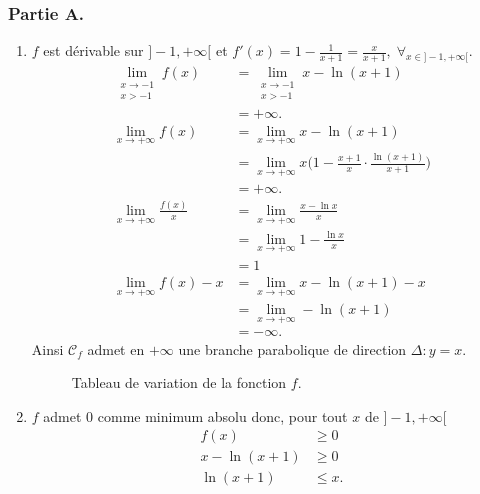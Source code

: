 \documentclass{article}
\begin{document}
\subsubsection*{Partie A.}
\begin{enumerate}
	\item $f$ est dérivable sur $]-1,+\infty[$ et $f'(x)=1-\frac{1}{x+1}=\frac{x}{x+1}, \;\forall_{x\in]-1,+\infty[}$.
	\begin{align*}
		\lim_{\substack{x\to-1 \\ x>-1}}f(x)&=\lim_{\substack{x\to-1 \\ x>-1}}x-\ln(x+1)\\
		&=+\infty.\\
		\lim_{x\to+\infty}f(x)&=\lim_{x\to+\infty}x-\ln(x+1)\\
		&=\lim_{x\to+\infty}x\Big(1-\frac{x+1}{x}\cdot\frac{\ln(x+1)}{x+1}\Big)\\
		&=+\infty.\\
		\lim_{x\to+\infty}\frac{f(x)}{x}&=\lim_{x\to+\infty}\frac{x-\ln x}{x}\\
		&=\lim_{x\to+\infty}1-\frac{\ln x}{x}\\
		&=1\\
		\lim_{x\to+\infty}f(x)-x&=\lim_{x\to+\infty}x-\ln(x+1)-x\\
		&=\lim_{x\to+\infty}-\ln(x+1)\\
		&=-\infty.
	\end{align*}
	Ainsi $\mathcal{C}_f$ admet en $+\infty$ une branche parabolique de direction $\Delta:y=x$. 
	\begin{figure}[h!]
	\centering
	\caption{Tableau de variation de la fonction $f$.}
	\end{figure}
	\item $f$ admet $0$ comme minimum absolu donc, pour tout $x$ de $]-1,+\infty[$
	\begin{align*}
		f(x)&\geq0\\
		x-\ln(x+1)&\geq0\\
		\ln(x+1)&\leq x.
	\end{align*}
	\begin{figure}[h!]
	\centering
	\begin{tikzpicture}

\end{tikzpicture}
\end{figure}
\end{enumerate}
\end{document}
